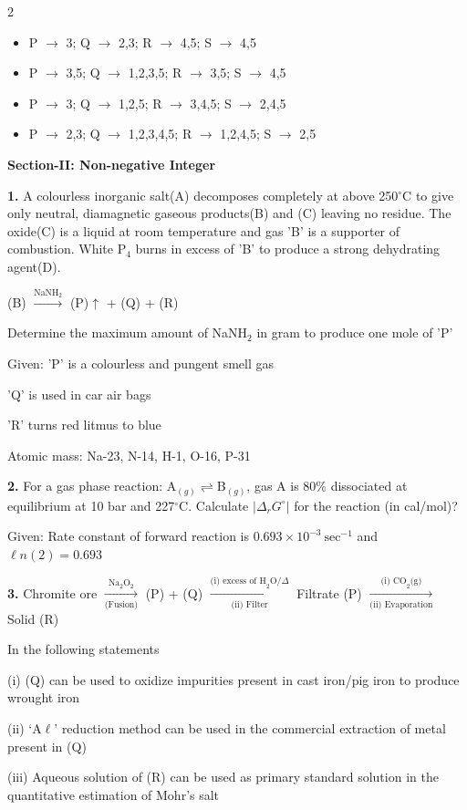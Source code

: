 \documentclass[10pt]{extarticle}
\newenvironment{qoptions}{\begin{itemize}[leftmargin=1.8em,itemsep=2pt,topsep=2pt,label={}]}{\end{itemize}}
\newcommand{\opt}[2]{\item[({#1})] {#2}}
\newcommand{\subsectionhdr}[1]{\par\vspace{3pt}\noindent\textbf{#1}\par\vspace{2pt}}
\begin{document}
\begin{multicols}{2}
\begin{qoptions}
\opt{A}{P $\to$ 3; Q $\to$ 2,3; R $\to$ 4,5; S $\to$ 4,5}
\opt{B}{P $\to$ 3,5; Q $\to$ 1,2,3,5; R $\to$ 3,5; S $\to$ 4,5}
\opt{C}{P $\to$ 3; Q $\to$ 1,2,5; R $\to$ 3,4,5; S $\to$ 2,4,5}
\opt{D}{P $\to$ 2,3; Q $\to$ 1,2,3,4,5; R $\to$ 1,2,4,5; S $\to$ 2,5}
\end{qoptions}

\subsectionhdr{Section-II: Non-negative Integer}

\textbf{1.} A colourless inorganic salt(A) decomposes completely at above 250$^\circ$C to give only neutral, diamagnetic gaseous products(B) and (C) leaving no residue. The oxide(C) is a liquid at room temperature and gas 'B' is a supporter of combustion. White P$_4$ burns in excess of 'B' to produce a strong dehydrating agent(D).

(B) $\xrightarrow{\text{NaNH}_2}$ (P)$\uparrow$ + (Q) + (R) \quad [salt]

Determine the maximum amount of NaNH$_2$ in gram to produce one mole of 'P'

Given: 'P' is a colourless and pungent smell gas

'Q' is used in car air bags

'R' turns red litmus to blue

Atomic mass: Na-23, N-14, H-1, O-16, P-31

\textbf{2.} For a gas phase reaction: A$_{(g)}\rightleftharpoons$B$_{(g)}$, gas A is 80\% dissociated at equilibrium at 10 bar and 227$^\circ$C. Calculate $|\Delta_rG^\circ|$ for the reaction (in cal/mol)?

Given: Rate constant of forward reaction is $0.693\times10^{-3}\ \text{sec}^{-1}$ and $\ell n(2)=0.693$

\textbf{3.} Chromite ore $\xrightarrow[\text{(Fusion)}]{\text{Na}_2\text{O}_2}$ (P) + (Q) $\xrightarrow[\text{(ii) Filter}]{\text{(i) excess of H}_2\text{O}/\Delta}$ Filtrate (P) $\xrightarrow[\text{(ii) Evaporation}]{\text{(i) CO}_2\text{(g)}}$ Solid (R)

In the following statements

(i) (Q) can be used to oxidize impurities present in cast iron/pig iron to produce wrought iron

(ii) `A$\ell$' reduction method can be used in the commercial extraction of metal present in (Q)

(iii) Aqueous solution of (R) can be used as primary standard solution in the quantitative estimation of Mohr's salt


\end{multicols}
\end{document}
